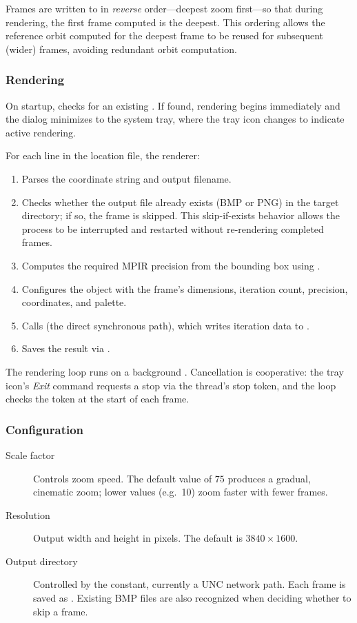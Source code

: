 Frames are written to  in \emph{reverse}
order---deepest zoom first---so that during rendering, the first
frame computed is the deepest.  This ordering allows the reference
orbit computed for the deepest frame to be reused for subsequent
(wider) frames, avoiding redundant orbit computation.

\subsubsection*{Rendering}

On startup,  checks for an existing
.  If found, rendering begins immediately and
the dialog minimizes to the system tray, where the tray icon changes
to indicate active rendering.

For each line in the location file, the renderer:

\begin{enumerate}
  \item Parses the coordinate string and output filename.
  \item Checks whether the output file already exists (BMP or PNG) in
        the target directory; if so, the frame is skipped.  This
        skip-if-exists behavior allows the process to be interrupted
        and restarted without re-rendering completed frames.
  \item Computes the required MPIR precision from the bounding box
        using .
  \item Configures the  object with the frame's
        dimensions, iteration count, precision, coordinates, and
        palette.
  \item Calls  (the direct synchronous path),
        which writes iteration data to .
  \item Saves the result via .
\end{enumerate}

The rendering loop runs on a background .
Cancellation is cooperative: the tray icon's \emph{Exit} command
requests a stop via the thread's stop token, and the loop checks
the token at the start of each frame.

\subsubsection*{Configuration}

\begin{description}
  \item[Scale factor] Controls zoom speed.  The default value of
    $75$ produces a gradual, cinematic zoom; lower values (e.g.~10)
    zoom faster with fewer frames.
  \item[Resolution] Output width and height in pixels.  The default
    is $3840 \times 1600$.
  \item[Output directory] Controlled by the 
    constant, currently a UNC network path.  Each frame is saved as
    . Existing BMP files are also recognized
    when deciding whether to skip a frame.
\end{description}

